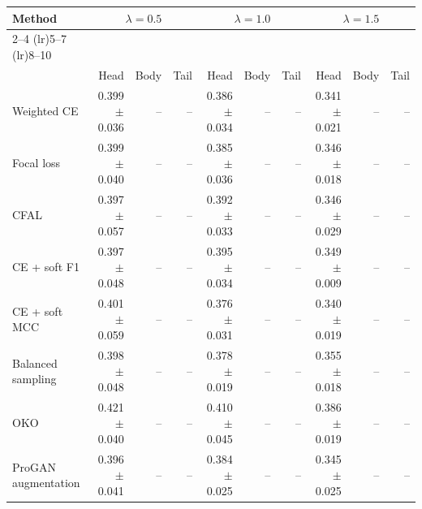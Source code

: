 \begin{tabular}{lrrrrrrrrr}
\toprule
Method & \multicolumn{3}{c}{$\lambda=0.5$} & \multicolumn{3}{c}{$\lambda=1.0$} & \multicolumn{3}{c}{$\lambda=1.5$} \\ \cmidrule(lr){2--4} \cmidrule(lr){5--7} \cmidrule(lr){8--10}\\
 & Head & Body & Tail & Head & Body & Tail & Head & Body & Tail\\
\midrule
Weighted CE & \num{0.399} $\pm$ \num{0.036} & -- & -- & \num{0.386} $\pm$ \num{0.034} & -- & -- & \num{0.341} $\pm$ \num{0.021} & -- & --\\
Focal loss & \num{0.399} $\pm$ \num{0.040} & -- & -- & \num{0.385} $\pm$ \num{0.036} & -- & -- & \num{0.346} $\pm$ \num{0.018} & -- & --\\
CFAL & \num{0.397} $\pm$ \num{0.057} & -- & -- & \num{0.392} $\pm$ \num{0.033} & -- & -- & \num{0.346} $\pm$ \num{0.029} & -- & --\\
CE + soft F1 & \num{0.397} $\pm$ \num{0.048} & -- & -- & \num{0.395} $\pm$ \num{0.034} & -- & -- & \num{0.349} $\pm$ \num{0.009} & -- & --\\
CE + soft MCC & \num{0.401} $\pm$ \num{0.059} & -- & -- & \num{0.376} $\pm$ \num{0.031} & -- & -- & \num{0.340} $\pm$ \num{0.019} & -- & --\\
Balanced sampling & \num{0.398} $\pm$ \num{0.048} & -- & -- & \num{0.378} $\pm$ \num{0.019} & -- & -- & \num{0.355} $\pm$ \num{0.018} & -- & --\\
OKO & \num{0.421} $\pm$ \num{0.040} & -- & -- & \num{0.410} $\pm$ \num{0.045} & -- & -- & \num{0.386} $\pm$ \num{0.019} & -- & --\\
ProGAN augmentation & \num{0.396} $\pm$ \num{0.041} & -- & -- & \num{0.384} $\pm$ \num{0.025} & -- & -- & \num{0.345} $\pm$ \num{0.025} & -- & --\\
\bottomrule
\end{tabular}
